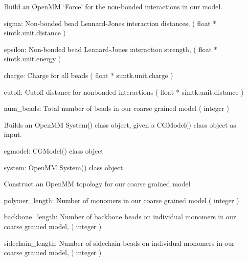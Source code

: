 \documentclass[letterpaper,12pt,english,openany,oneside]{sphinxmanual}
\begin{document}
\begin{fulllineitems}
\label{\detokenize{build:build.cg_build.build_mm_force}}
Build an OpenMM ‘Force’ for the non-bonded interactions in our model.

sigma: Non-bonded bead Lennard-Jones interaction distances,
( float * simtk.unit.distance )

epsilon: Non-bonded bead Lennard-Jones interaction strength,
( float * simtk.unit.energy )

charge: Charge for all beads
( float * simtk.unit.charge )

cutoff: Cutoff distance for nonbonded interactions
( float * simtk.unit.distance )

num\_beads: Total number of beads in our coarse grained model
( integer )

\end{fulllineitems}


\begin{fulllineitems}
\label{\detokenize{build:build.cg_build.build_system}}
Builds an OpenMM System() class object, given a CGModel() class object as input.

cgmodel: CGModel() class object

system: OpenMM System() class object

\end{fulllineitems}


\begin{fulllineitems}
\label{\detokenize{build:build.cg_build.build_topology}}
Construct an OpenMM topology for our coarse grained model

polymer\_length: Number of monomers in our coarse grained model
( integer )

backbone\_length: Number of backbone beads on individual monomers
in our coarse grained model, ( integer )

sidechain\_length: Number of sidechain beads on individual monomers
in our coarse grained model, ( integer )

\end{fulllineitems}
\end{document}
